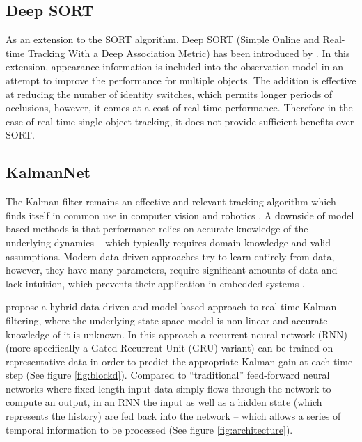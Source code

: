 \documentclass[a4paper,twoside,12pt]{report}
\begin{document}
\subsection{Deep SORT}

As an extension to the SORT algorithm, Deep SORT (Simple Online and Real-time Tracking With a Deep Association Metric) has been introduced by \cite{deepsort}. In this extension, appearance information is included into the observation model in an attempt to improve the performance for multiple objects. The addition is effective at reducing the number of identity switches, which permits longer periods of occlusions, however, it comes at a cost of real-time performance. Therefore in the case of real-time single object tracking, it does not provide sufficient benefits over SORT. 

\pagebreak
\subsection{KalmanNet}

The Kalman filter remains an effective and relevant tracking algorithm which finds itself in common use in computer vision and robotics \citep{kalmanforever}. A downside of model based methods is that performance relies on accurate knowledge of the underlying dynamics -- which typically requires domain knowledge and valid assumptions. Modern data driven approaches try to learn entirely from data, however, they have many parameters, require significant amounts of data and lack intuition, which prevents their application in embedded systems \citep{kalmannet}.

\cite{kalmannet} propose a hybrid data-driven and model based approach to real-time Kalman filtering, where the underlying state space model is non-linear and accurate knowledge of it is unknown. In this approach a recurrent neural network (RNN) (more specifically a Gated Recurrent Unit (GRU) variant) can be trained on representative data in order to predict the appropriate Kalman gain at each time step  (See figure \ref{fig:blockd}). Compared to ``traditional'' feed-forward neural networks where fixed length input data simply flows through the network to compute an output, in an RNN the input as well as a hidden state (which represents the history) are fed back into the network -- which allows a series of temporal information to be processed  (See figure \ref{fig:architecture}). 
\end{document}
